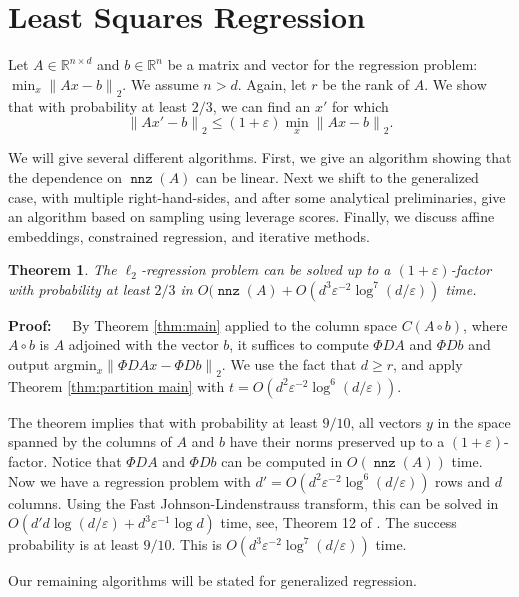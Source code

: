 \documentclass{sig-alternate}
\newcommand{\norm}[1]{{\| #1 \|}}
\DeclareMathOperator{\nnz}{\mathtt{nnz}}
\newcommand{\eps}{\varepsilon}
\newtheorem{theorem}{Theorem}
\def\FullBox{\hbox{\vrule width 8pt height 8pt depth 0pt}}
\def\qed{\ifmmode\qquad\FullBox\else{\unskip\nobreak\hfil
\penalty50\hskip1em\null\nobreak\hfil\FullBox
\parfillskip=0pt\finalhyphendemerits=0\endgraf}\fi}
\newenvironment{proof}{\begin{trivlist} \item {\bf Proof:~~}}
  {\qed\end{trivlist}}
\begin{document}
\section{Least Squares Regression}\label{sec:regression}
Let $A \in \mathbb{R}^{n \times d}$ and $b \in \mathbb{R}^n$ be a matrix and
vector for the regression problem: $\min_x \norm{Ax-b}_2$. We assume $n > d$. Again,
let $r$ be the rank of $A$. 
We show that with probability at least $2/3$, 
we can find an $x'$ for which
$$\norm{Ax'-b}_2 \leq (1+\eps)\min_x \norm{Ax-b}_2.$$

We will give several different algorithms.
First, we give an algorithm showing that the dependence on $\nnz(A)$ can be linear.
Next we shift to the generalized case, with multiple right-hand-sides,
and after some analytical preliminaries, give an algorithm based on sampling
using leverage scores. Finally, we discuss affine embeddings, constrained regression,
and iterative methods.




\begin{theorem}\label{thm:lin reg}
The $\ell_2$-regression problem can be solved up to a $(1+\eps)$-factor with probability at least 
$2/3$ in $O(\nnz(A) + O(d^3 \eps^{-2} \log^7(d/\eps))$ time.
\end{theorem}
\begin{proof}
By Theorem \ref{thm:main} applied to the column space $C(A\circ b)$,
where $A\circ b$ is $A$ adjoined with the vector $b$,
it suffices to compute $\Phi D A$ and $\Phi D b$ and output 
argmin$_x \norm{\Phi D Ax- \Phi D b}_2$. We use the fact that $d \geq r$, and apply
Theorem \ref{thm:partition main} with $t = O(d^2 \eps^{-2} \log^6(d/\eps))$. 

The theorem implies that with probability at least $9/10$, 
all vectors $y$ in the
space spanned by the columns of $A$ and $b$ 
have their norms preserved up to a $(1+\eps)$-factor. 
Notice that $\Phi D A$ and $\Phi D b$ can be computed in 
$O(\nnz(A))$ time. Now we have a regression problem with $d' = O(d^2 \eps^{-2} \log^6(d/\eps))$ rows
and $d$ columns. 
Using the Fast Johnson-Lindenstrauss
transform, this can be solved in $O(d' d \log (d/\eps) + d^3 \eps^{-1} \log d)$ time, see, Theorem 12 of \cite{s06}. The
success probability is at least $9/10$. This is $O(d^3 \eps^{-2} \log^7(d/\eps))$ time. 
\end{proof}




Our remaining algorithms will be stated for generalized regression.
\end{document}
